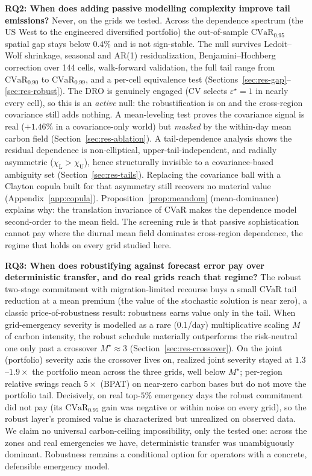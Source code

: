 \documentclass[12pt]{article}
\newcommand{\CVaR}{\mathrm{CVaR}}
\newcommand{\chiU}{\chi_{\mathrm{U}}}
\newcommand{\chiL}{\chi_{\mathrm{L}}}
\begin{document}
\textbf{RQ2: When does adding passive modelling complexity improve tail emissions?}
Never, on the grids we tested. Across the dependence spectrum (the US West to the
engineered diversified portfolio) the out-of-sample $\CVaR_{0.95}$ spatial gap stays
below $0.4\%$ and is not sign-stable. The null survives Ledoit--Wolf shrinkage,
seasonal and AR(1) residualization, Benjamini--Hochberg correction over 144 cells,
walk-forward validation, the full tail range from $\CVaR_{0.90}$ to $\CVaR_{0.99}$,
and a per-cell equivalence test (Sections~\ref{sec:res-gap}--\ref{sec:res-robust}).
The DRO is genuinely engaged (CV selects $\varepsilon^\star=1$ in nearly every cell),
so this is an \emph{active} null: the robustification is on and the cross-region covariance
still adds nothing. A mean-leveling test proves the covariance signal is real ($+1.46\%$ in
a covariance-only world) but \emph{masked} by the within-day mean carbon field
(Section~\ref{sec:res-ablation}). A tail-dependence analysis shows the residual
dependence is non-elliptical, upper-tail-independent, and radially asymmetric
($\chiL>\chiU$), hence structurally invisible to a covariance-based ambiguity set
(Section~\ref{sec:res-tails}). Replacing the covariance ball with a Clayton copula
built for that asymmetry still recovers no material value (Appendix~\ref{app:copula}).
Proposition~\ref{prop:meandom} (mean-dominance) explains why: the translation
invariance of CVaR makes the dependence model second-order to the mean field. The
screening rule is that passive sophistication cannot pay where the diurnal mean field
dominates cross-region dependence, the regime that holds on every grid studied here.

\textbf{RQ3: When does robustifying against forecast error pay over deterministic
transfer, and do real grids reach that regime?} The robust two-stage commitment with
migration-limited recourse buys a small CVaR tail reduction at a mean premium (the
value of the stochastic solution is near zero), a classic price-of-robustness result:
robustness earns value only in the tail. When grid-emergency severity is modelled as a
rare ($0.1$/day) multiplicative scaling $M$ of carbon intensity, the robust schedule
materially outperforms the risk-neutral one only past a crossover $M^\star\approx3$
(Section~\ref{sec:res-crossover}). On the joint (portfolio) severity axis the crossover
lives on, realized joint severity stayed at $1.3$--$1.9\times$ the portfolio mean across
the three grids, well below $M^\star$; per-region relative swings reach $5\times$ (BPAT)
on near-zero carbon bases but do not move the portfolio tail. Decisively, on real
top-$5\%$ emergency days the robust commitment did not pay (its $\CVaR_{0.95}$ gain was
negative or within noise on every grid), so the robust layer's promised value is
characterized but unrealized on observed data. We claim no universal carbon-ceiling
impossibility, only the tested one: across the zones and real emergencies we have,
deterministic transfer was unambiguously dominant. Robustness remains a conditional
option for operators with a concrete, defensible emergency model.
\end{document}
